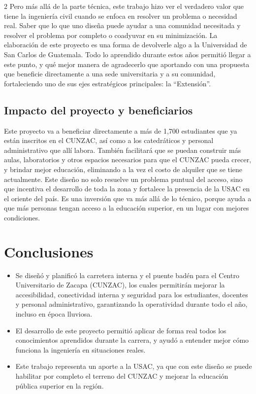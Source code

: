 \documentclass[12pt,spanish,Letterpaper,openany]{book}
\begin{document}
\begin {multicols}{2}
Pero más allá de la parte técnica, este trabajo hizo ver el verdadero valor que tiene la ingeniería civil cuando se enfoca en resolver un problema o necesidad real. Saber que lo que uno diseña puede ayudar a una comunidad necesitada y resolver el problema por completo o coadyuvar en su minimización. La elaboración de este proyecto es una forma de devolverle algo a la Universidad de San Carlos de Guatemala. Todo lo aprendido durante estos años permitió llegar a este punto, y qué mejor manera de agradecerlo que aportando con una propuesta que beneficie directamente a una sede universitaria y a su comunidad, fortaleciendo uno de sus ejes estratégicos principales: la ``Extensión''.

\hypertarget{impacto-del-proyecto-y-beneficiarios}{%
\subsection{Impacto del proyecto y beneficiarios}\label{impacto-del-proyecto-y-beneficiarios}}

Este proyecto va a beneficiar directamente a más de 1,700 estudiantes que ya están inscritos en el CUNZAC, así como a los catedráticos y personal administrativo que allí labora. También facilitará que se puedan construir más aulas, laboratorios y otros espacios necesarios para que el CUNZAC pueda crecer, y brindar mejor educación, eliminando a la vez el costo de alquiler que se tiene actualmente. Este diseño no solo resuelve un problema puntual del acceso, sino que incentiva el desarrollo de toda la zona y fortalece la presencia de la USAC en el oriente del país. Es una inversión que va más allá de lo técnico, porque ayuda a que más personas tengan acceso a la educación superior, en un lugar con mejores condiciones.

\bigskip
\bigskip
\bigskip
\bigskip
\bigskip
\bigskip

\hypertarget{conclusiones-2}{%
\section{Conclusiones}\label{conclusiones-2}}

\begin{itemize}
\item
  Se diseñó y planificó la carretera interna y el puente badén para el Centro Universitario de Zacapa (CUNZAC), los cuales permitirán mejorar la accesibilidad, conectividad interna y seguridad para los estudiantes, docentes y personal administrativo, garantizando la operatividad durante todo el año, incluso en época lluviosa.
\item
  El desarrollo de este proyecto permitió aplicar de forma real todos los conocimientos aprendidos durante la carrera, y ayudó a entender mejor cómo funciona la ingeniería en situaciones reales.
\item
  Este trabajo representa un aporte a la USAC, ya que con este diseño se puede habilitar por completo el terreno del CUNZAC y mejorar la educación pública superior en la región.
\end{itemize}


\end{multicols}
\end{document}
